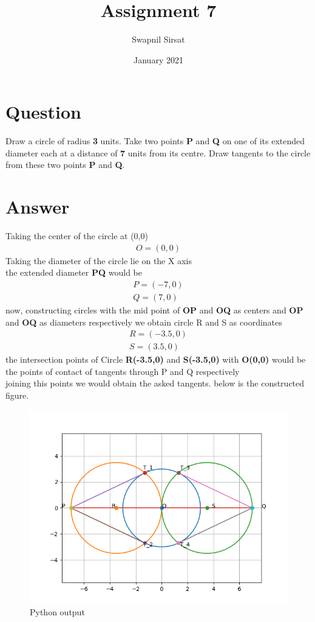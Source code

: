 \documentclass{article}
\title{Assignment 7}
\author{Swapnil Sirsat}
\date{January 2021}
\begin{document}
\maketitle

\section*{Question}
Draw a circle of radius \textbf{3} units. Take two points
\textbf{P} and \textbf{Q} on one of its extended diameter each
at a distance of \textbf{7} units from its centre. Draw
tangents to the circle from these two points \textbf{P}
and \textbf{Q}.
\section*{Answer}
Taking the center of the circle at (0,0)
\begin{gather*}
    O = (0,0)
\end{gather*}
Taking the diameter of the circle lie on the X axis \\
the extended diameter \textbf{PQ} would be
\begin{gather*}
    P = (-7,0)\\
    Q = (7,0)
\end{gather*}
now, constructing circles with the mid point of \textbf{OP} and \textbf{OQ} as centers and  \textbf{OP} and \textbf{OQ} as diameters respectively we obtain circle R and S as coordinates
\begin{gather*}
    R = (-3.5,0)\\
    S = (3.5,0)
\end{gather*}
the intersection points of Circle \textbf{R(-3.5,0)} and \textbf{S(-3.5,0)} with \textbf{O(0,0)} would be the points of contact of tangents through P and Q respectively
\\ joining this points we would obtain the asked tangents.
\newpage
below is the constructed figure.
\begin{figure}[h!]
    \centering
    \includegraphics{Figure_1.png}
    \caption{Python output}
    \label{fig:my_label}
\end{figure}
\end{document}
